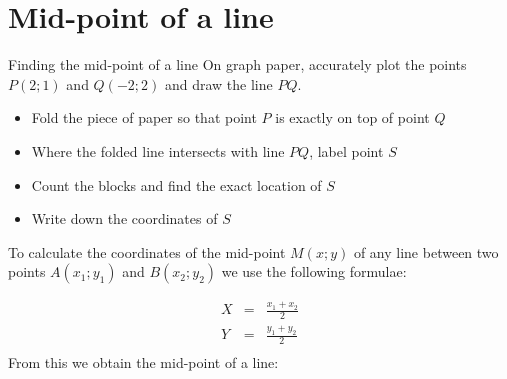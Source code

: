 \section{Mid-point of a line}
\begin{activity}{Finding the mid-point of a line}
On graph paper, accurately plot the points $P(2;1)$ and $Q(-2;2)$ and draw the line $PQ$.
\begin{itemize}
 \item Fold the piece of paper so that point $P$ is exactly on top of point $Q$
\item Where the folded line intersects with line $PQ$, label point $S$
\item Count the blocks and find the exact location of $S$
\item Write down the coordinates of $S$
\end{itemize}

\end{activity}
To calculate the coordinates of the mid-point  $M(x;y)$ of any line between two points $A(x_1;y_1)$ and $B(x_2;y_2)$ we use the following formulae:

\setcounter{subfigure}{0}
\begin{figure}[H] %
\begin{center}
\end{center}
\end{figure}      

\begin{eqnarray*}
X & = & \frac{{x}_{1} + {x}_{2}}{2} \\ 
Y & = & \frac{{y}_{1} + {y}_{2}}{2} \\  
\end{eqnarray*}
From this we obtain the mid-point of a line:

